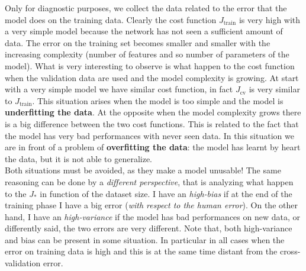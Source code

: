 \noindent
Only for diagnostic purposes, we collect the data related to the error that the model does on the training data. Clearly the cost function $J_{\text{train}}$ is very high with a  very simple model because the network has not seen a sufficient amount of data. The error on the training set becomes smaller and smaller with the increasing complexity (number of features and so number of parameters of the model). What is very interesting to observe is what happen to the cost function when the validation data are used and the model complexity is growing. At start with a very simple model we have similar cost function, in fact $J_{\text{cv}}$ is very similar to $J_\text{train}$. This situation arises when the model is too simple and the model is \textbf{underfitting the data}. At the opposite when the model complexity grows there is a big difference between the two cost functions. This is related to the fact that the model has very bad performances with never seen data. In this situation we are in front of a problem of \textbf{overfitting the data}: the model has learnt by heart the data, but it is not able to generalize. \\
Both situations must be avoided, as they make a model unusable! The same reasoning can be done by a \textit{different perspective}, that is analyzing what happen to the $J_*$ in function of the dataset size. I have an \textit{high-bias} if at the end of the training phase I have a big error (\textit{with respect  to the human error}). On the other hand, I have an \textit{high-variance} if the model has bad performances on new data, or differently said, the two errors are very different. Note that, both high-variance and bias can be present in some situation. In particular in all cases when the error on training data is high and this is at the same time distant from the cross-validation error.

